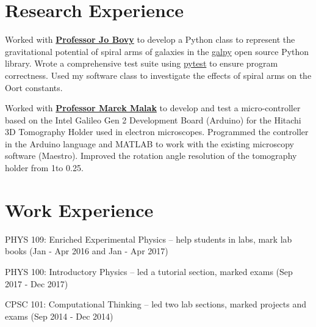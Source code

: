 \documentclass[]{deedy-resume-openfont}
\begin{document}
\lastupdated




\section{Research Experience}
Worked with \textbf{\href{http://astro.utoronto.ca/~bovy/}{Professor Jo Bovy}} to develop a Python class to represent the gravitational potential of spiral arms of galaxies in the \textsf{\href{https://github.com/jobovy/galpy}{galpy}} open source Python library. Wrote a comprehensive test suite using \textsf{\href{https://docs.pytest.org/en/latest/}{pytest}} to ensure program correctness. Used my software class to investigate the effects of spiral arms on the Oort constants.
\sectionsep

Worked with \textbf{\href{https://sites.google.com/site/temsemeels/marek-malac}{Professor Marek Malak}} to develop and test a micro-controller based on the Intel Galileo Gen 2 Development Board (Arduino) for the Hitachi 3D Tomography Holder used in electron microscopes. Programmed the controller in the Arduino language and MATLAB to work with the existing microscopy software (Maestro). Improved the rotation angle resolution of the tomography holder from 1\degree to 0.25\degree.
\sectionsep

\section{Work Experience}
\begin{tightemize}
\item PHYS 109: Enriched Experimental Physics – help students in labs, mark lab books (Jan - Apr 2016 and Jan - Apr 2017)
\item PHYS 100: Introductory Physics – led a tutorial section, marked exams (Sep 2017 - Dec 2017)
\item CPSC 101: Computational Thinking – led two lab sections, marked projects and exams (Sep 2014 - Dec 2014) 
\end{tightemize}
\sectionsep
\end{document}
